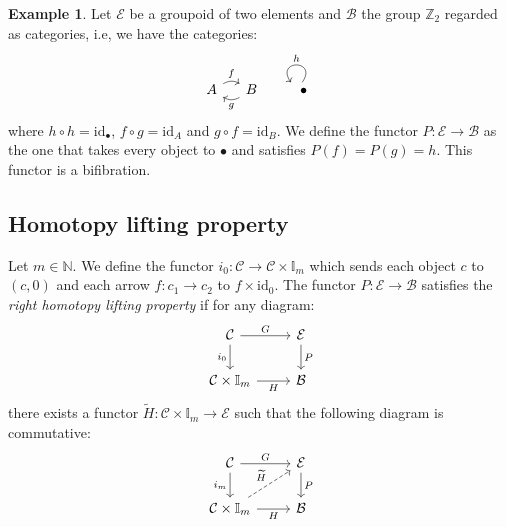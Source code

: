 \documentclass[12pt,reqno]{amsart}
\theoremstyle{definition}
\newtheorem{example}[teo]{Example}
\theoremstyle{remark}
\numberwithin{figure}{section}%
\newcommand{\Ba}{\mathcal{B}}
\newcommand{\CC}{\mathcal{C}}
\newcommand{\E}{\mathcal{E}}
\newcommand{\id}{\mathrm{id}}
\newcommand{\wtilde}{\widetilde}
\begin{document}
\begin{example}\label{Groupoid}
    Let $\E$ be a groupoid of two elements and $\Ba$ the group $\mathbb{Z}_2$ regarded as categories, i.e, we have the categories:
    $$
\begin{tikzcd}[column sep=12pt, row sep=12pt] 
A \arrow[r, "f", bend left] & B \arrow[l, "g", bend left] &\quad \bullet \arrow["h"', loop, distance=2em, in=125, out=55]
\end{tikzcd}
    $$
    where $h \circ h= \id_{\bullet}$, $f \circ g = \id_A$ and $g 
 \circ f= \id_B$. We define the functor $P \colon \E \rightarrow \Ba$ as the one that takes every object to $\bullet$ and satisfies $P(f)=P(g)=h$. This functor is a bifibration.
\end{example}


\subsection{Homotopy lifting property}

Let $m\in \mathbb{N}$. We define the functor $i_0\colon \CC \to \CC\times \mathbb{I}_m$ which sends each object $c$ to $(c,0)$ and each arrow $f \colon c_1\to c_2$ to $f\times \id_0$.
    The functor $P\colon \E \to \Ba$ satisfies the \emph{ right homotopy lifting property} if for any diagram:
    \begin{equation*}
\begin{tikzcd}%
\CC \arrow[d,"i_0"'] \arrow[r,"G"] & \E  \arrow[d,"P"] \\
\CC\times \mathbb{I}_m \arrow[r,"H"']                   & \Ba           
\end{tikzcd}
\end{equation*}
there exists a functor $\wtilde H \colon \CC\times \mathbb{I}_m \to\E$ such that the following diagram is commutative:
\begin{equation*}
\begin{tikzcd}%
\CC \arrow[d,"i_m"'] \arrow[r,"G"] & \E  \arrow[d,"P"] \\
\CC\times \mathbb{I}_m \arrow[ur,"\wtilde H",dashed]\arrow[r,"H"']                   & \Ba           
\end{tikzcd}
\end{equation*}
\end{document}
